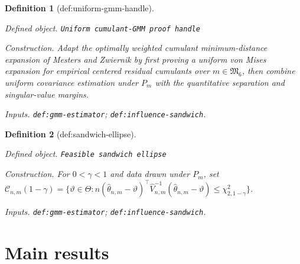 \documentclass{article}
\newtheorem{definition}{Definition}
\begin{document}
\begin{definition}[def:uniform-gmm-handle]\label{def:uniform-gmm-handle}
\par\smallskip\noindent\emph{Defined object.} \texttt{Uniform cumulant-\allowbreak{}GMM proof handle}
\par\smallskip\noindent\emph{Construction.} Adapt the optimally weighted cumulant minimum-distance expansion of Mesters and Zwiernik by first proving a uniform von Mises expansion for empirical centered residual cumulants over \(m\in\mathfrak M_6\), then combine uniform covariance estimation under \(P_m\) with the quantitative separation and singular-value margins.
\par\smallskip\noindent\emph{Inputs.} \texttt{def:\allowbreak{}gmm-\allowbreak{}estimator}; \texttt{def:\allowbreak{}influence-\allowbreak{}sandwich}.
\end{definition}

\begin{definition}[def:sandwich-ellipse]\label{def:sandwich-ellipse}
\par\smallskip\noindent\emph{Defined object.} \texttt{Feasible sandwich ellipse}
\par\smallskip\noindent\emph{Construction.} For \(0<\gamma<1\) and data drawn under \(P_m\), set \(\mathcal C_{n,m}(1-\gamma)=\{\vartheta\in\Theta:n(\widehat\theta_{n,m}-\vartheta)^\top\widehat V_{n,m}^{-1}(\widehat\theta_{n,m}-\vartheta)\le\chi^2_{2,1-\gamma}\}\).
\par\smallskip\noindent\emph{Inputs.} \texttt{def:\allowbreak{}gmm-\allowbreak{}estimator}; \texttt{def:\allowbreak{}influence-\allowbreak{}sandwich}.
\end{definition}

\section{Main results}
\end{document}
